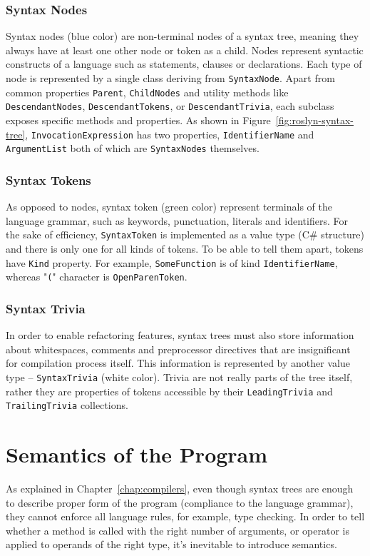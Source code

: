 \documentclass[
  digital, %
  table,   %
  lof,     %
  lot,     %
  oneside,
]{fithesis3}
\begin{document}
\subsubsection{Syntax Nodes}
Syntax nodes (blue color) are non-terminal nodes of a syntax tree, meaning they always have at least one other node or token as a child. Nodes represent syntactic constructs of a language such as statements, clauses or declarations. Each type of node is represented by a single class deriving from \texttt{SyntaxNode}. Apart from common properties \texttt{Parent}, \texttt{ChildNodes} and utility methods like \texttt{DescendantNodes}, \texttt{DescendantTokens}, or \texttt{DescendantTrivia}, each subclass exposes specific methods and properties. As shown in Figure~\ref{fig:roslyn-syntax-tree}, \texttt{InvocationExpression} has two properties, \texttt{IdentifierName} and \texttt{ArgumentList} both of which are \texttt{SyntaxNodes} themselves.
 
\subsubsection{Syntax Tokens}
As opposed to nodes, syntax token (green color) represent terminals of the language grammar, such as keywords, punctuation, literals and identifiers. For the sake of efficiency, \texttt{SyntaxToken} is implemented as a value type (C\# structure) and there is only one for all kinds of tokens. To be able to tell them apart, tokens have \texttt{Kind} property. For example, \texttt{SomeFunction} is of kind \texttt{IdentifierName}, whereas "\texttt{(}" character is \texttt{OpenParenToken}.

\subsubsection{Syntax Trivia}
In order to enable refactoring features, syntax trees must also store information about whitespaces, comments and preprocessor directives that are insignificant for compilation process itself. This information is represented by another value type -- \texttt{SyntaxTrivia} (white color). Trivia are not really parts of the tree itself, rather they are properties of tokens accessible by their \texttt{LeadingTrivia} and \texttt{TrailingTrivia} collections.

\section{Semantics of the Program}
As explained in Chapter~\ref{chap:compilers}, even though syntax trees are enough to describe proper form of the program (compliance to the language grammar), they cannot enforce all language rules, for example, type checking. In order to tell whether a method is called with the right number of arguments, or operator is applied to operands of the right type, it's inevitable to introduce semantics. 
\end{document}
